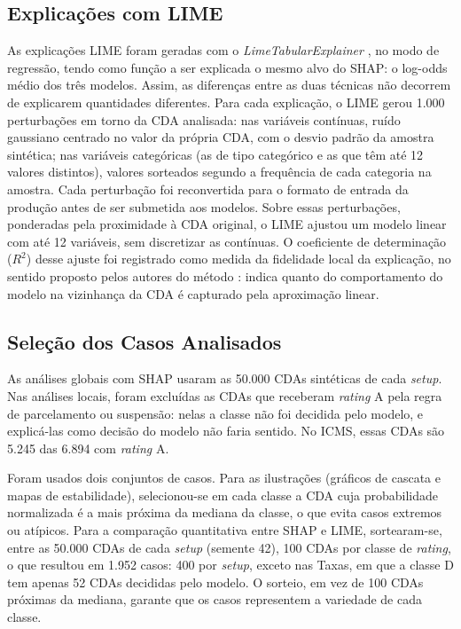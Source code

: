 \subsection{Explicações com LIME}

As explicações LIME foram geradas com o \textit{LimeTabularExplainer} \cite{ribeiroWhyShouldTrust2016}, no modo de regressão, tendo como função a ser explicada o mesmo alvo do SHAP: o log-odds médio dos três modelos. Assim, as diferenças entre as duas técnicas não decorrem de explicarem quantidades diferentes. Para cada explicação, o LIME gerou 1.000 perturbações em torno da CDA analisada: nas variáveis contínuas, ruído gaussiano centrado no valor da própria CDA, com o desvio padrão da amostra sintética; nas variáveis categóricas (as de tipo categórico e as que têm até 12 valores distintos), valores sorteados segundo a frequência de cada categoria na amostra. Cada perturbação foi reconvertida para o formato de entrada da produção antes de ser submetida aos modelos. Sobre essas perturbações, ponderadas pela proximidade à CDA original, o LIME ajustou um modelo linear com até 12 variáveis, sem discretizar as contínuas. O coeficiente de determinação ($R^2$) desse ajuste foi registrado como medida da fidelidade local da explicação, no sentido proposto pelos autores do método \cite{ribeiroWhyShouldTrust2016}: indica quanto do comportamento do modelo na vizinhança da CDA é capturado pela aproximação linear.

\subsection{Seleção dos Casos Analisados}

As análises globais com SHAP usaram as 50.000 CDAs sintéticas de cada \textit{setup}. Nas análises locais, foram excluídas as CDAs que receberam \textit{rating} A pela regra de parcelamento ou suspensão: nelas a classe não foi decidida pelo modelo, e explicá-las como decisão do modelo não faria sentido. No ICMS, essas CDAs são 5.245 das 6.894 com \textit{rating} A.

Foram usados dois conjuntos de casos. Para as ilustrações (gráficos de cascata e mapas de estabilidade), selecionou-se em cada classe a CDA cuja probabilidade normalizada é a mais próxima da mediana da classe, o que evita casos extremos ou atípicos. Para a comparação quantitativa entre SHAP e LIME, sortearam-se, entre as 50.000 CDAs de cada \textit{setup} (semente 42), 100 CDAs por classe de \textit{rating}, o que resultou em 1.952 casos: 400 por \textit{setup}, exceto nas Taxas, em que a classe D tem apenas 52 CDAs decididas pelo modelo. O sorteio, em vez de 100 CDAs próximas da mediana, garante que os casos representem a variedade de cada classe.


